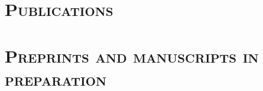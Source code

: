 \documentclass[centered,overlapped,line]{res}
\begin{document}
\begin{resume}




  \section{\bf \large \scshape  Publications}

  { \setlength{\parskip}{2.5ex}


    
  }

  \section{\bf \large \scshape  Preprints and manuscripts in preparation}


\end{resume}
\end{document}
